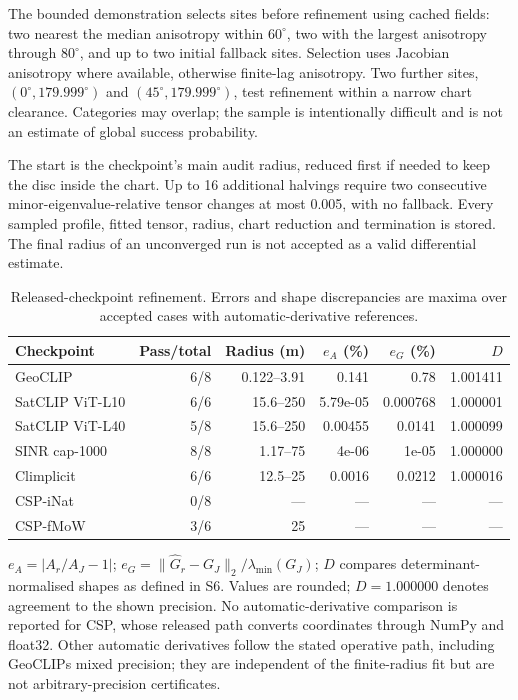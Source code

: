 The bounded demonstration selects sites before refinement using cached fields: two nearest the median anisotropy within $60^\circ$, two with the largest anisotropy through $80^\circ$, and up to two initial fallback sites. Selection uses Jacobian anisotropy where available, otherwise finite-lag anisotropy. Two further sites, $(0^\circ,179.999^\circ)$ and $(45^\circ,179.999^\circ)$, test refinement within a narrow chart clearance. Categories may overlap; the sample is intentionally difficult and is not an estimate of global success probability.

The start is the checkpoint's main audit radius, reduced first if needed to keep the disc inside the chart. Up to 16 additional halvings require two consecutive minor-eigenvalue-relative tensor changes at most 0.005, with no fallback. Every sampled profile, fitted tensor, radius, chart reduction and termination is stored. The final radius of an unconverged run is not accepted as a valid differential estimate.
\begin{table}[htbp]\centering\small
\caption{Released-checkpoint refinement. Errors and shape discrepancies are maxima over accepted cases with automatic-derivative references.}
\label{tab:releasedradius}
\begin{tabular}{@{}lrrrrr@{}}\toprule
Checkpoint&Pass/total&Radius (m)&$e_A$ (\%)&$e_G$ (\%)&$D$\\\midrule
GeoCLIP&6/8&0.122--3.91&0.141&0.78&1.001411\\
SatCLIP ViT-L10&6/6&15.6--250&5.79e-05&0.000768&1.000001\\
SatCLIP ViT-L40&5/8&15.6--250&0.00455&0.0141&1.000099\\
SINR cap-1000&8/8&1.17--75&4e-06&1e-05&1.000000\\
Climplicit&6/6&12.5--25&0.0016&0.0212&1.000016\\
CSP-iNat&0/8&---&---&---&---\\
CSP-fMoW&3/6&25&---&---&---\\
\bottomrule\end{tabular}
\par\smallskip\parbox{.97\textwidth}{\footnotesize $e_A=|A_r/A_J-1|$; $e_G=\|\widehat G_r-G_J\|_2/\lambda_{\min}(G_J)$; $D$ compares determinant-normalised shapes as defined in S6. Values are rounded; $D=1.000000$ denotes agreement to the shown precision. No automatic-derivative comparison is reported for CSP, whose released path converts coordinates through NumPy and float32. Other automatic derivatives follow the stated operative path, including GeoCLIP\textquotesingle s mixed precision; they are independent of the finite-radius fit but are not arbitrary-precision certificates.}
\end{table}
